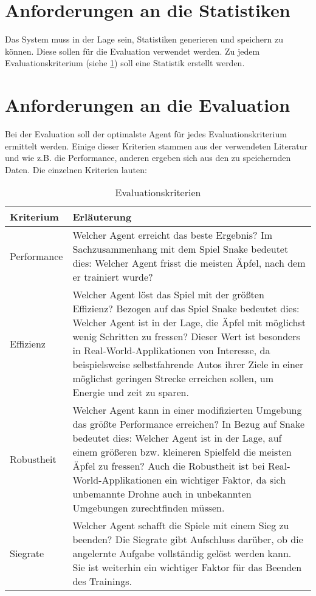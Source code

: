 \section{Anforderungen an die Statistiken}
Das System muss in der Lage sein, Statistiken generieren und speichern zu können. Diese sollen für die Evaluation verwendet werden. Zu jedem Evaluationskriterium (siehe \ref{tab:Kriterien}) soll eine Statistik erstellt werden. 

\section{Anforderungen an die Evaluation} \label{sec:Anforderungen_an_die_Evaluation}
Bei der Evaluation soll der optimalste Agent für jedes Evaluationskriterium ermittelt werden.
Einige dieser Kriterien stammen aus der verwendeten Literatur \cite{Autonomous_Agents_in_Snake_Game_via_DRL} und \cite{UAV} wie z.B. die Performance, anderen ergeben sich aus den zu speichernden Daten.
Die einzelnen Kriterien lauten:
\begin{longtable}[h]{|p{4cm}|p{\linewidth - 5cm}|}
	\caption{Evaluationskriterien}
	\label{tab:Kriterien} 
	\endfirsthead
	\endhead
	\hline
	Kriterium & Erläuterung \\
	\hline
	Performance & Welcher Agent erreicht das beste Ergebnis? Im Sachzusammenhang mit dem Spiel Snake bedeutet dies: Welcher Agent frisst die meisten Äpfel, nach dem er trainiert wurde?\\
	\hline
	Effizienz & Welcher Agent löst das Spiel mit der größten Effizienz? Bezogen auf das Spiel Snake bedeutet dies: Welcher Agent ist in der Lage, die Äpfel mit möglichst wenig Schritten zu fressen? Dieser Wert ist besonders in Real-World-Applikationen von Interesse, da beispielsweise selbstfahrende Autos ihrer Ziele in einer möglichst geringen Strecke erreichen sollen, um Energie und zeit zu sparen.\\
	\hline
	Robustheit & Welcher Agent kann in einer modifizierten Umgebung das größte Performance erreichen? In Bezug auf Snake bedeutet dies: Welcher Agent ist in der Lage, auf einem größeren bzw. kleineren Spielfeld die meisten Äpfel zu fressen? Auch die Robustheit ist bei Real-World-Applikationen ein wichtiger Faktor, da sich unbemannte Drohne auch in unbekannten Umgebungen zurechtfinden müssen.\\
	\hline
	Siegrate & Welcher Agent schafft die Spiele mit einem Sieg zu beenden? Die Siegrate gibt Aufschluss darüber, ob die angelernte Aufgabe vollständig gelöst werden kann. Sie ist weiterhin ein wichtiger Faktor für das Beenden des Trainings.\\
	\hline
\end{longtable}